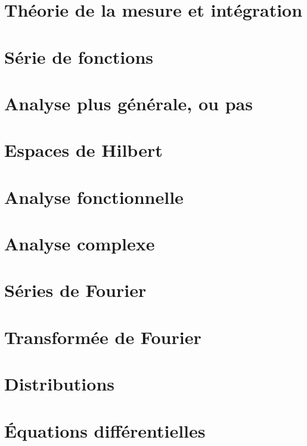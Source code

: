 \chapter{Théorie de la mesure et intégration}





\chapter{Série de fonctions}


\chapter{Analyse plus générale, ou pas}





\chapter{Espaces de Hilbert}


\chapter{Analyse fonctionnelle}



\chapter{Analyse complexe}



\chapter{Séries de Fourier}


\chapter{Transformée de Fourier}


\chapter{Distributions}


\chapter{Équations différentielles}


